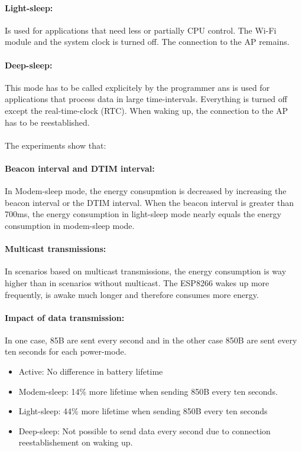 \documentclass{report}
\begin{document}
\paragraph{Light-sleep:} Is used for applications that need less or partially CPU control. The Wi-Fi module and the system clock is turned off. The connection to the AP remains.
\paragraph{Deep-sleep:} This mode has to be called explicitely by the programmer ans is used for applications that process data in large time-intervals. Everything is turned off except the real-time-clock (RTC). When waking up, the connection to the AP has to be reestablished.\\\\
The experiments show that:
\paragraph{Beacon interval and DTIM interval:} 
In Modem-sleep mode, the energy consupmtion is decreased by increasing the beacon interval or the DTIM interval. When the beacon interval is greater than 700ms, the energy consumption in light-sleep mode nearly equals the energy consumption in modem-sleep mode.
\paragraph{Multicast transmissions:}
In scenarios based on multicast transmissions, the energy consumption is way higher than in scenarios without multicast. The ESP8266 wakes up more frequently, is awake much longer and therefore consumes more energy.
\paragraph{Impact of data transmission:}
In one case, 85B are sent every second and in the other case 850B are sent every ten seconds for each power-mode.
\begin{itemize}
        \item Active: No difference in battery lifetime
        \item Modem-sleep: 14\% more lifetime when sending 850B every ten seconds.
        \item Light-sleep: 44\% more lifetime when sending 850B every ten seconds
        \item Deep-sleep: Not possible to send data every second due to connection reestablishement on waking up.
    \end{itemize}
\end{document}
